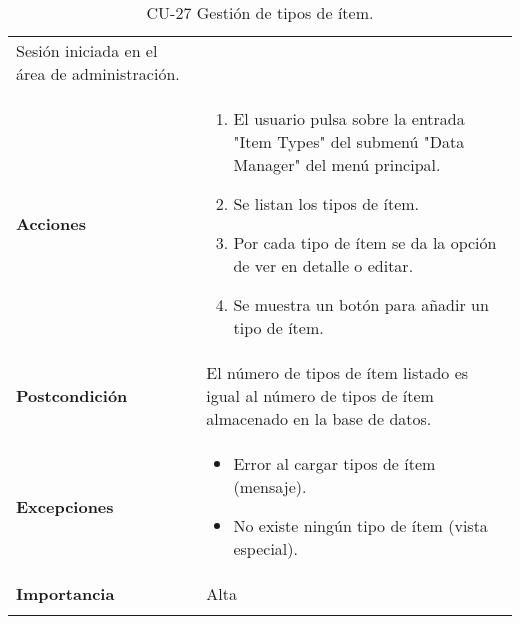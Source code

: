 \begin{longtable}[]{@{}ll@{}}
\begin{minipage}[t]{0.75\columnwidth}
Sesión iniciada en el área de administración.\strut
\end{minipage}\tabularnewline
\begin{minipage}[t]{0.19\columnwidth}\raggedright
\textbf{Acciones}\strut
\end{minipage} & \begin{minipage}[t]{0.75\columnwidth}\raggedright
\begin{enumerate}
\def\labelenumi{\arabic{enumi}.}
\tightlist
\item
  El usuario pulsa sobre la entrada "Item Types" del submenú "Data
  Manager" del menú principal.
\item
  Se listan los tipos de ítem.
\item
  Por cada tipo de ítem se da la opción de ver en detalle o editar.
\item
  Se muestra un botón para añadir un tipo de ítem.
\end{enumerate}\strut
\end{minipage}\tabularnewline
\begin{minipage}[t]{0.19\columnwidth}\raggedright
\textbf{Postcondición}\strut
\end{minipage} & \begin{minipage}[t]{0.75\columnwidth}\raggedright
El número de tipos de ítem listado es igual al número de tipos de ítem
almacenado en la base de datos.\strut
\end{minipage}\tabularnewline
\begin{minipage}[t]{0.19\columnwidth}\raggedright
\textbf{Excepciones}\strut
\end{minipage} & \begin{minipage}[t]{0.75\columnwidth}\raggedright
\begin{itemize}
\tightlist
\item
  Error al cargar tipos de ítem (mensaje).
\item
  No existe ningún tipo de ítem (vista especial).
\end{itemize}\strut
\end{minipage}\tabularnewline
\begin{minipage}[t]{0.19\columnwidth}\raggedright
\textbf{Importancia}\strut
\end{minipage} & \begin{minipage}[t]{0.75\columnwidth}\raggedright
Alta\strut
\end{minipage}\tabularnewline
\bottomrule
\caption{CU-27 Gestión de tipos de ítem.}
\end{longtable}

